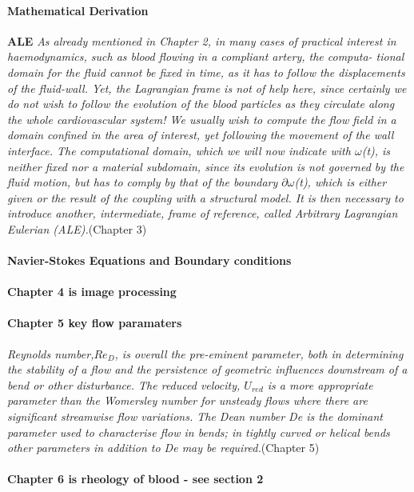 \documentclass[11pt,letterpaper]{article}
\begin{document}
\paragraph{Mathematical Derivation} \textbf{ALE} \textit{As already mentioned in Chapter 2, in many cases of practical interest in haemodynamics, such as blood flowing in a compliant artery, the computa- tional domain for the fluid cannot be fixed in time, as it has to follow the displacements of the fluid-wall. Yet, the Lagrangian frame is not of help here, since certainly we do not wish to follow the evolution of the blood particles as they circulate along the whole cardiovascular system! We usually wish to compute the flow field in a domain confined in the area of interest, yet following the movement of the wall interface. The computational domain, which we will now indicate with $\omega$(t), is neither fixed nor a material subdomain, since its evolution is not governed by the fluid motion, but has to comply by that of the boundary $\partial\omega$(t), which is either given or the result of the coupling with a structural model. It is then necessary to introduce another, intermediate, frame of reference, called Arbitrary Lagrangian Eulerian (ALE).}(Chapter 3)

\paragraph{Navier-Stokes Equations and Boundary conditions}

\paragraph{Chapter 4 is image processing}
\paragraph{Chapter 5 key flow paramaters} \textit{Reynolds number,$Re_D$, is overall the pre-eminent parameter, both in determining the stability of a flow and the persistence of geometric influences downstream of a bend or other disturbance. The reduced velocity, $U_{red}$ is a more appropriate parameter than the Womersley number for unsteady flows where there are significant streamwise flow variations. The Dean number De is the dominant parameter used to characterise flow in bends; in tightly curved or helical bends other parameters in addition to De may be required.}(Chapter 5)
\paragraph{Chapter 6 is rheology of blood - see section 2}
\end{document}

